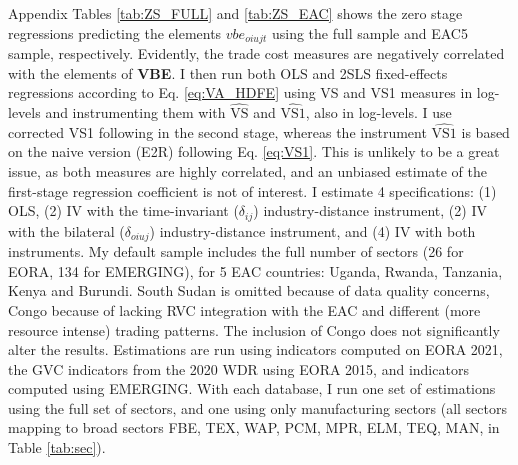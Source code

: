 \documentclass[a4paper]{article}
\begin{document}
Appendix Tables \ref{tab:ZS_FULL} and \ref{tab:ZS_EAC} shows the zero stage regressions predicting the elements $vbe_{oiujt}$ using the full sample and EAC5 sample, respectively. Evidently, the trade cost measures are negatively correlated with the elements of \textbf{VBE}. %
I then run both OLS and 2SLS fixed-effects regressions according to Eq. \ref{eq:VA_HDFE} using VS and VS1 measures in log-levels and instrumenting them with $\hat{\text{VS}}$ and $\hat{\text{VS1}}$, also in log-levels. I use corrected VS1 following \citet{borin2019measuring} in the second stage, whereas the instrument $\hat{\text{VS1}}$ is based on the naive version (E2R) following Eq. \ref{eq:VS1}. This is unlikely to be a great issue, as both measures are highly correlated, and an unbiased estimate of the first-stage regression coefficient is not of interest. I estimate 4 specifications: (1) OLS, (2) IV with the time-invariant ($\delta_{ij}$) industry-distance instrument,  (2) IV with the bilateral ($\delta_{oiuj}$) industry-distance instrument, and (4) IV with both instruments. My default sample includes the full number of sectors (26 for EORA, 134 for EMERGING), for 5 EAC countries: Uganda, Rwanda, Tanzania, Kenya and Burundi. South Sudan is omitted because of data quality concerns, Congo because of lacking RVC integration with the EAC and different (more resource intense) trading patterns. The inclusion of Congo does not significantly alter the results. Estimations are run using indicators computed on EORA 2021, the GVC indicators from the 2020 WDR using EORA 2015, and indicators computed using EMERGING. With each database, I run one set of estimations using the full set of sectors, and one using only manufacturing sectors (all sectors mapping to broad sectors FBE, TEX, WAP, PCM, MPR, ELM, TEQ, MAN, in Table \ref{tab:sec}). \newline
\end{document}
